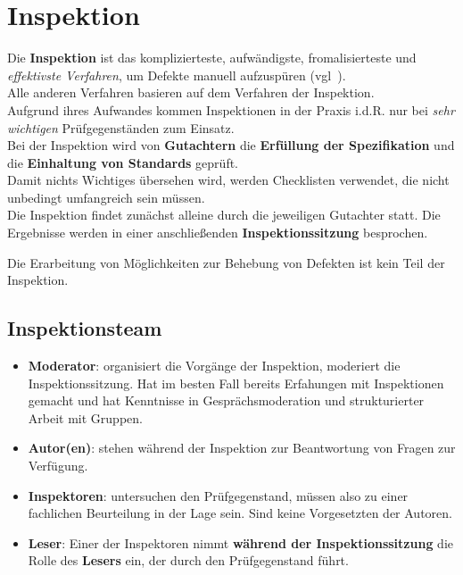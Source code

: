 \section{Inspektion}
Die \textbf{Inspektion} ist das komplizierteste, aufwändigste, fromalisierteste und \textit{effektivste Verfahren}, um Defekte manuell aufzuspüren (vgl~\cite[18]{Wed09c}).\\
Alle anderen Verfahren basieren auf dem Verfahren der Inspektion.\\

\noindent
Aufgrund ihres Aufwandes kommen Inspektionen in der Praxis i.d.R. nur bei \textit{sehr wichtigen} Prüfgegenständen zum Einsatz.\\

\noindent
Bei der Inspektion wird von \textbf{Gutachtern} die \textbf{Erfüllung der Spezifikation} und die \textbf{Einhaltung von Standards} geprüft.\\
Damit nichts Wichtiges übersehen wird, werden Checklisten verwendet, die nicht unbedingt umfangreich sein müssen.\\
Die Inspektion findet zunächst alleine durch die jeweiligen Gutachter statt.
Die Ergebnisse werden in einer anschließenden \textbf{Inspektionssitzung} besprochen.

\begin{tcolorbox}[colback=white]
    Die Erarbeitung von Möglichkeiten zur Behebung von Defekten ist kein Teil der Inspektion.
\end{tcolorbox}

\subsection{Inspektionsteam}

\begin{itemize}
    \item \textbf{Moderator}: organisiert die Vorgänge der Inspektion, moderiert die Inspektionssitzung. Hat im besten Fall bereits Erfahungen mit Inspektionen gemacht und hat Kenntnisse in Gesprächsmoderation und strukturierter Arbeit mit Gruppen.
    \item \textbf{Autor(en)}: stehen während der Inspektion zur Beantwortung von Fragen zur Verfügung.
    \item \textbf{Inspektoren}: untersuchen den Prüfgegenstand, müssen also zu einer fachlichen Beurteilung in der Lage sein. Sind keine Vorgesetzten der Autoren.
    \item \textbf{Leser}: Einer der Inspektoren nimmt \textbf{während der Inspektionssitzung} die Rolle des \textbf{Lesers} ein, der durch den Prüfgegenstand führt.
\end{itemize}

